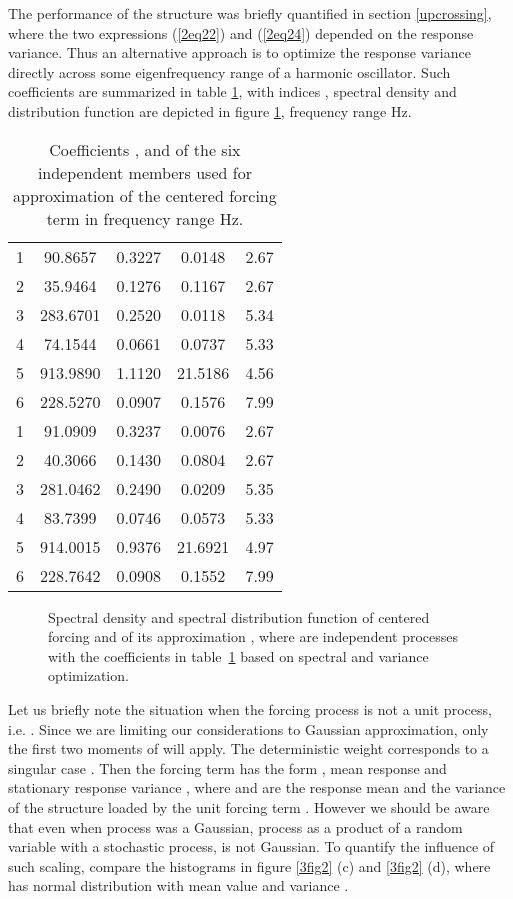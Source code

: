 \documentclass[preprint,12pt,authoryear]{elsarticle}
\begin{document}
The performance of the structure was briefly quantified in section \ref{upcrossing}, where the two expressions (\ref{2eq22}) and (\ref{2eq24}) depended on the response variance. Thus an alternative approach is to optimize the response variance directly across some eigenfrequency range of a harmonic oscillator. Such coefficients are summarized in table \ref{3tab2}, with indices , spectral density and distribution function are depicted in figure \ref{3fig5}, frequency range  Hz.
\begin{table}
	\centering
	\caption{Coefficients ,  and  of the six independent  members used for approximation of the centered forcing term  in frequency range  Hz.}
	\begin{tabular}{|c|c|c|c|c|}\hline
	 &  &  &  &  \\\hline
	1 & 90.8657 & 0.3227 & 0.0148 & 2.67 \\
	2 & 35.9464 & 0.1276 & 0.1167 & 2.67 \\
	3 & 283.6701 & 0.2520 & 0.0118 & 5.34 \\
	4 & 74.1544 & 0.0661 & 0.0737 & 5.33 \\
	5 & 913.9890 & 1.1120 & 21.5186 & 4.56 \\
	6 & 228.5270 & 0.0907 & 0.1576 & 7.99 \\\hline
  1 & 91.0909 & 0.3237 & 0.0076 & 2.67 \\
	2 & 40.3066 & 0.1430 & 0.0804 & 2.67 \\
	3 & 281.0462 & 0.2490 & 0.0209 & 5.35 \\
	4 & 83.7399 & 0.0746 & 0.0573 & 5.33 \\
	5 & 914.0015 & 0.9376 & 21.6921 & 4.97 \\
	6 & 228.7642 & 0.0908 & 0.1552 & 7.99 \\\hline
	\end{tabular}
	\label{3tab2}
\end{table}
\begin{figure}
	\centering
	\caption{Spectral density and spectral distribution function of centered forcing  and of its approximation , where  are independent  processes with the coefficients in table~\ref{3tab2} based on spectral and variance optimization.}
	\label{3fig5}
\end{figure}

Let us briefly note the situation when the forcing process  is not a unit process, i.e. . Since we are limiting our considerations to Gaussian approximation, only the first two moments of  will apply. The deterministic weight corresponds to a singular case . Then the forcing term has the form , mean response  and stationary response variance , where  and  are the response mean and the variance of the structure loaded by the unit forcing term . However we should be aware that even when process  was a Gaussian, process  as a product of a random variable with a stochastic process, is not Gaussian. To quantify the influence of such scaling, compare the histograms in figure \ref{3fig2} (c) and \ref{3fig2} (d), where  has normal distribution with mean value  and variance .
\end{document}
